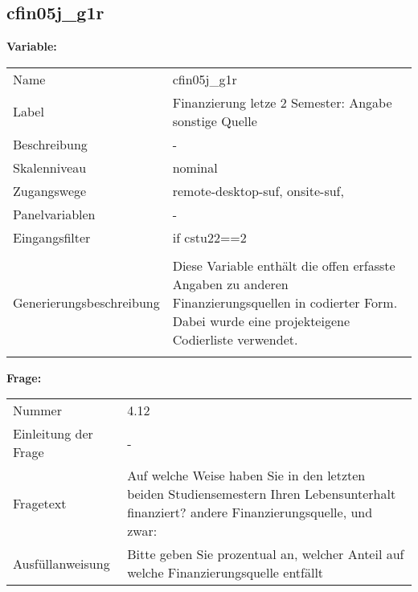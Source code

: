 	
	
	\subsection{cfin05j\_g1r}
	\label{subSection:cfin05j_g1r}

	\noindent\textbf{Variable:}\\
		\begin{tabular}{lL{11.3cm}}
			\label{tableVariable:cfin05j_g1r}
			Name & cfin05j\_g1r \\
			Label & Finanzierung letze 2 Semester: Angabe sonstige Quelle \\
			Beschreibung & - \\
			Skalenniveau & nominal \\
			Zugangswege &
				remote-desktop-suf,
				onsite-suf,
 \\
			Panelvariablen & -
			 \\
			Eingangsfilter & if cstu22==2 \\
 \\
					Generierungsbeschreibung & Diese Variable enthält die offen erfasste Angaben zu anderen Finanzierungsquellen in codierter Form. Dabei wurde eine projekteigene Codierliste verwendet.
				 \\	
			 \\
		\end{tabular}

		\vspace*{1 cm}
		\noindent\textbf{Frage:}\\
		\begin{tabular}{lL{11.3cm}}
			\label{tableQuestion:cfin05j_g1r}
			Nummer & 4.12 \\
			Einleitung der Frage & - \\
			Fragetext & Auf welche Weise haben Sie in den letzten beiden Studiensemestern Ihren Lebensunterhalt finanziert?
andere Finanzierungsquelle, und zwar: \\
			Ausfüllanweisung & Bitte geben Sie prozentual an, welcher Anteil auf welche Finanzierungsquelle entfällt \\
		\end{tabular}





